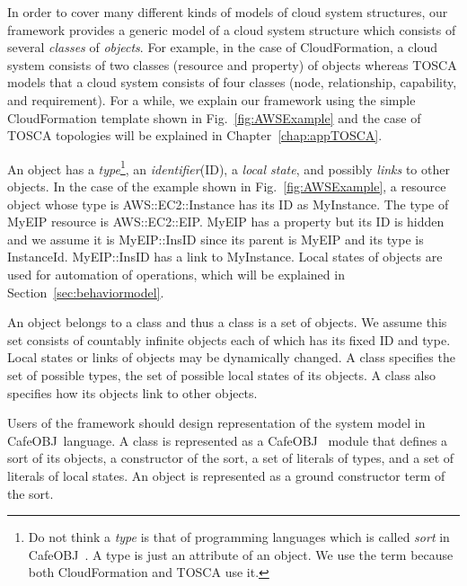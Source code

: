 \documentclass[12pt]{report}
\newcommand{\cafeobj}{{\sf CafeOBJ}~}
\begin{document}
In order to cover many different kinds of models of cloud system
structures, our framework provides a generic model of a cloud system
structure which consists of several {\it classes} of {\it
  objects}. For example, in the case of CloudFormation, a cloud system
consists of two classes (resource and property) of objects whereas
TOSCA models that a cloud system consists of four classes (node,
relationship, capability, and requirement). For a while, we explain
our framework using the simple CloudFormation template shown in
Fig.~\ref{fig:AWSExample} and the case of TOSCA topologies will be
explained in Chapter~\ref{chap:appTOSCA}.

An object has a {\it type}\footnote{Do not think a {\it type} is that
  of programming languages which is called {\it sort} in \cafeobj. A
  type is just an attribute of an object. We use the term because both
  CloudFormation and TOSCA use it.}, an {\it identifier}(ID), a {\it
  local state}, and possibly {\it links} to other objects. In the case
of the example shown in Fig.~\ref{fig:AWSExample}, a resource object
whose type is AWS::EC2::Instance has its ID as MyInstance. The type of
MyEIP resource is AWS::EC2::EIP. MyEIP has a property but its ID is
hidden and we assume it is MyEIP::InsID since its parent is MyEIP and
its type is InstanceId. MyEIP::InsID has a link to MyInstance. Local
states of objects are used for automation of operations, which will be
explained in Section~\ref{sec:behaviormodel}. 

An object belongs to a class and thus a class is a set of objects. We
assume this set consists of countably infinite objects each of which
has its fixed ID and type. Local states or links of objects may be
dynamically changed.  A class specifies the set of possible types, the set
of possible local states of its objects. A class also specifies how its
objects link to other objects.

Users of the framework should design representation of the system
model in \cafeobj language.  A class is represented as a \cafeobj
module that defines a sort of its objects, a constructor of the sort,
a set of literals of types, and a set of literals of local states.  An
object is represented as a ground constructor term of the sort.
\end{document}
